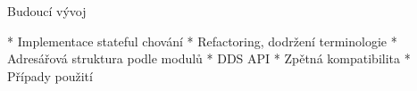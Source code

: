 \sec Budoucí vývoj

* Implementace stateful chování
* Refactoring, dodržení terminologie
* Adresářová struktura podle modulů
* DDS API
* Zpětná kompatibilita
* Případy použití

